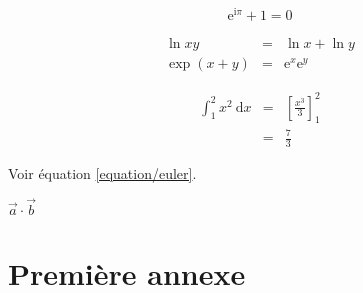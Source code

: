 \documentclass[a4paper,11pt]{article}
\newcommand{\diff}{\ \mathrm{d}}
\begin{document}
\begin{equation} \label{equation/euler}
\mathrm{e}^{\mathrm{i}\pi}+1=0
\end{equation}

\begin{eqnarray}
\ln xy                           & = & \ln x + \ln y \\
\exp \left ( x+y \right ) & = & \mathrm{e}^x  \mathrm{e}^y
\end{eqnarray}

\begin{eqnarray}
\int_1^2 x^2 \diff x & = & \left[\frac{x^3}{3}\right ]_1^2 \nonumber \\
                               & = & \frac{7}{3}
\end{eqnarray}

Voir équation \eqref{equation/euler}.

$\vec{a}\cdot\vec{b}$
\appendix
\section{Première annexe}
\end{document}
